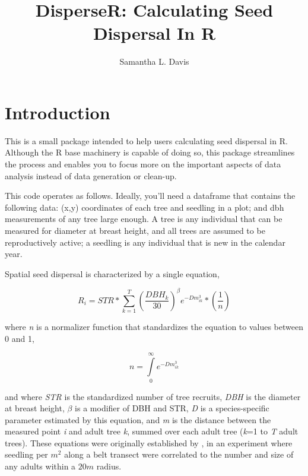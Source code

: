 \documentclass{report}
\title{DisperseR: Calculating Seed Dispersal In R}
\author{Samantha L. Davis}
\begin{document}
\maketitle
\tableofcontents


\chapter{Introduction}

This is a small package intended to help users calculating seed dispersal in R. Although the R base machinery is capable of doing so, this package streamlines the process and enables you to focus more on the important aspects of data analysis instead of data generation or clean-up.

This code operates as follows. Ideally, you'll need a dataframe that contains the following data: (x,y) coordinates of each tree and seedling in a plot; and dbh measurements of any tree large enough. A tree is any individual that can be measured for diameter at breast height, and all trees are assumed to be reproductively active; a seedling is any individual that is new in the calendar year.

Spatial seed dispersal is characterized by a single equation,

\begin{equation}
\label{eq:dispersal}
R_i = STR * \sum\limits_{k=1}^T\left( \frac{DBH_k}{30}\right) ^\beta e^{-Dm_{ik}^3} * \left( \frac{1}{n}\right)
\end{equation}

where \textit{n} is a normalizer function that standardizes the equation to values between 0 and 1,

\begin{equation}
n = \int\limits_{0}^\infty e^{-Dm_{ik}^3} \nonumber
\end{equation}

and where \textit{STR} is the standardized number of tree recruits, \textit{DBH} is the diameter at breast height, \textit{$\beta$} is a modifier of DBH and STR,  \textit{D} is a species-specific parameter estimated by this equation, and \textit{m} is the distance between the measured point \textit{i} and adult tree \textit{k}, summed over each adult tree (\textit{k}=1 to \textit{T} adult trees). These equations were originally established by \citet{Ribbens1994}, in an experiment where seedling per $m^2$ along a belt transect were correlated to the number and size of any adults within a $20 m$ radius.
\end{document}
